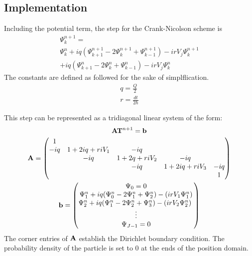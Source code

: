 \documentclass[twoside,twocolumn]{article}
\begin{document}
\subsection{Implementation}
Including the potential term, the step for the Crank-Nicolson scheme is
\begin{equation}
	\begin{split}
	\Psi_{k}^{n+1} = \\
	\Psi_{k}^{n} + iq(\Psi_{k+1}^{n+1}
	 - 2\Psi_{k}^{n+1} + \Psi_{k-1}^{n+1}) 
	 - irV_j \Psi_{k}^{n+1}\\
	 + iq(\Psi_{k+1}^{n}
	 - 2\Psi_{k}^{n} + \Psi_{k-1}^{n})  
	 - irV_j \Psi_{k}^{n}
 \end{split}
\end{equation}
 The constants are defined as followed for the sake of simplflication.
 \begin{equation}
	 \begin{split}
		 q = \frac{Q}{2} \\
	r = \frac{dt}{2 \hbar}
\end{split}
 \end{equation}

 This step can be represented as a tridiagonal linear system of the form:
\begin{equation}
	\vb{A}\vb{T}^{n+1} = \vb{b}
\end{equation}
\small
\begin{gather*}
		\vb{A} =     
		\begin{pmatrix}
1 &  &  &  & \\ 
 -iq&1+2iq + riV_1&-iq&  & \\ 
 &  -iq&1+2q + riV_2&-iq& \\ 
 &  &-iq  &1+2iq+riV_3 &-iq \\ 
 &  &  &  &1 \\
 \end{pmatrix}
 \\
 \vb{b} = 
 \begin{pmatrix}
\Psi_0 = 0\\
\Psi_{1}^{n}+iq(\Psi_{0}^{n}-2\Psi_{1}^{n}+\Psi_{2}^{n}) - (irV_1\Psi_{1}^{n})\\
\Psi_{2}^{n}+iq(\Psi_{1}^{n}-2\Psi_{2}^{n}+\Psi_{3}^{n}) - (irV_2\Psi_{2}^{n})\ \\
\vdots\\
\Psi_{J-1} = 0
\end{pmatrix}
\end{gather*}
\normalsize
The corner entries of $\vb{A}$ establish the Dirichlet boundary condition. The probability density of the particle is set to 0 at the ends of the position domain.
\end{document}

